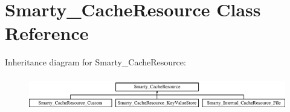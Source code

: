\hypertarget{class_smarty___cache_resource}{}\section{Smarty\+\_\+\+Cache\+Resource Class Reference}
\label{class_smarty___cache_resource}
Inheritance diagram for Smarty\+\_\+\+Cache\+Resource\+:\begin{figure}[H]
\begin{center}
\leavevmode
\includegraphics[height=1.499331cm]{class_smarty___cache_resource}
\end{center}
\end{figure}
